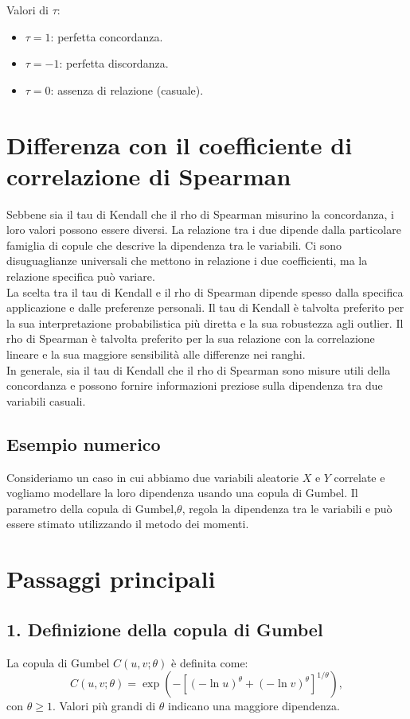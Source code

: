 \documentclass[a4paper,12pt]{article}
\begin{document}
\begin{itemize}
	Valori di \(\tau\):
	\begin{itemize}
		\item \(\tau = 1\): perfetta concordanza.
		\item \(\tau = -1\): perfetta discordanza.
		\item \(\tau = 0\): assenza di relazione (casuale).
	\end{itemize}
	\section*{Differenza con il coefficiente di correlazione di Spearman}
	Sebbene sia il tau di Kendall che il rho di Spearman misurino la concordanza, i loro valori possono essere diversi. La relazione tra i due dipende dalla particolare famiglia di copule che descrive la dipendenza tra le variabili. Ci sono disuguaglianze universali che mettono in relazione i due coefficienti, ma la relazione specifica può variare.\\
	La scelta tra il tau di Kendall e il rho di Spearman dipende spesso dalla specifica applicazione e dalle preferenze personali. Il tau di Kendall è talvolta preferito per la sua interpretazione probabilistica più diretta e la sua robustezza agli outlier. Il rho di Spearman è talvolta preferito per la sua relazione con la correlazione lineare e la sua maggiore sensibilità alle differenze nei ranghi.\\
	In generale, sia il tau di Kendall che il rho di Spearman sono misure utili della concordanza e possono fornire informazioni preziose sulla dipendenza tra due variabili casuali.
	\subsection*{Esempio numerico}
	Consideriamo un caso in cui abbiamo due variabili aleatorie $X$ e $Y$ correlate e vogliamo modellare la loro dipendenza usando una copula di Gumbel. Il parametro della copula di Gumbel,$\theta$, regola la dipendenza tra le variabili e può essere stimato utilizzando il metodo dei momenti.
	\section*{Passaggi principali}
	
	\subsection*{1. Definizione della copula di Gumbel}
	La copula di Gumbel \(C(u, v; \theta)\) è definita come:
	\[
	C(u, v; \theta) = \exp \left( - \left[(-\ln u)^\theta + (-\ln v)^\theta \right]^{1/\theta} \right),
	\]
	con \(\theta \geq 1\). Valori più grandi di \(\theta\) indicano una maggiore dipendenza.
	

\end{itemize}
\end{document}

